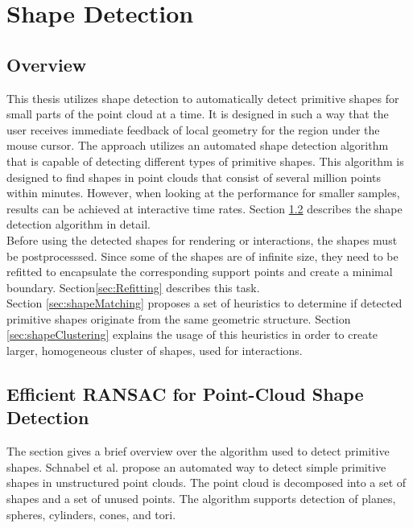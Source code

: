 \chapter{Shape Detection}
\label{chap:shapeDetection}


\section{Overview}

This thesis utilizes shape detection to automatically detect primitive shapes for small parts of the point cloud at a time. It is designed in such a way that the user receives immediate feedback of local geometry for the region under the mouse cursor. The approach utilizes an automated shape detection algorithm that is capable of detecting different types of primitive shapes. This algorithm is designed to find shapes in point clouds that consist of several million points within minutes. However, when looking at the performance for smaller samples, results can be achieved at interactive time rates. Section \ref{sec:schnabel} describes the shape detection algorithm in detail. 
\\

Before using the detected shapes for rendering or interactions, the shapes must be postprocesssed. Since some of the shapes are of infinite size, they need to be refitted to encapsulate the corresponding support points and create a minimal boundary. Section\ref{sec:Refitting} describes this task. 
\\

Section \ref{sec:shapeMatching} proposes a set of heuristics to determine if detected primitive shapes originate from the same geometric structure. Section \ref{sec:shapeClustering} explains the usage of this heuristics in order to create larger, homogeneous cluster of shapes, used for interactions. 
 

\section{Efficient RANSAC for Point-Cloud Shape Detection}
\label{sec:schnabel}

The section gives a brief overview over the algorithm used to detect primitive shapes. 
Schnabel et al. \cite{schnabel-2007-efficient} propose an automated way to detect simple primitive shapes in unstructured point clouds. The point cloud is decomposed into a set of shapes and a set of unused points. The algorithm supports detection of planes, spheres, cylinders, cones, and tori. 


